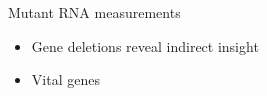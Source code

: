 Mutant RNA measurements
\begin{itemize}
    \item Gene deletions reveal indirect insight
    
    \item Vital genes




\end{itemize}

